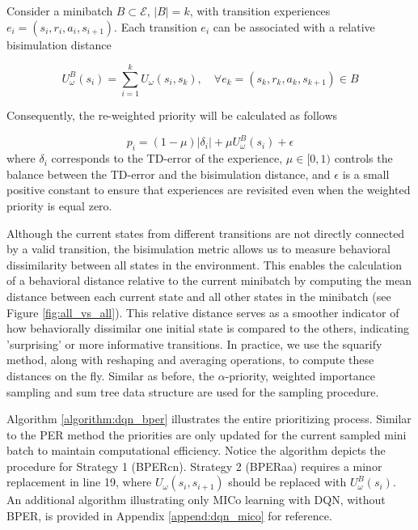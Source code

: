 \begin{strategy}
Consider a minibatch $B \subset \mathcal{E}$, $|B| = k$, with transition experiences $e_i = (s_i, r_i, a_i, s_{i+1})$. Each transition $e_i$ can be associated with a relative bisimulation distance

\begin{equation}
    U^B_\omega(s_i) = \sum_{i=1}^k U_\omega(s_i, s_k), \quad \forall e_k = (s_k, r_k, a_k, s_{k+1}) \in B
\end{equation}

Consequently, the re-weighted priority will be calculated as follows

\begin{equation}
    p_i = (1 - \mu) |\delta_i| + \mu U^B_\omega(s_i) + \epsilon
\end{equation}
where \(\delta_i\) corresponds to the TD-error of the experience, \(\mu \in [0,1)\) controls the balance between the TD-error and the bisimulation distance, and \(\epsilon\) is a small positive constant to ensure that experiences are revisited even when the weighted priority is equal zero.
\end{strategy}


Although the current states from different transitions are not directly connected by a valid transition, the bisimulation metric allows us to measure behavioral dissimilarity between all states in the environment. This enables the calculation of a behavioral distance relative to the current minibatch by computing the mean distance between each current state and all other states in the minibatch (see Figure \ref{fig:all_vs_all}). This relative distance serves as a smoother indicator of how behaviorally dissimilar one initial state is compared to the others, indicating 'surprising' or more informative transitions. In practice, we use the squarify method, along with reshaping and averaging operations, to compute these distances on the fly. Similar as before, the $\alpha$-priority, weighted importance sampling and sum tree data structure are used for the sampling procedure.


Algorithm \ref{algorithm:dqn_bper} illustrates the entire prioritizing process. Similar to the PER method the priorities are only updated for the current sampled mini batch to maintain computational efficiency. Notice the algorithm depicts the procedure for Strategy 1 (BPERcn). Strategy 2 (BPERaa) requires a minor replacement in line 19, where \(U_\omega(s_i, s_{i+1})\) should be replaced with \(U^B_\omega(s_i)\). An additional algorithm illustrating only MICo learning with DQN, without BPER, is provided in Appendix \ref{append:dqn_mico} for reference.

